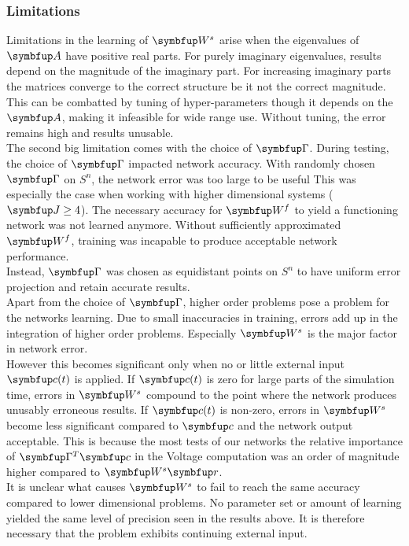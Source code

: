 \subsubsection{Limitations}
Limitations in the learning of $\bmu{W}^s$ arise when the eigenvalues of $\bmu{A}$ have positive real parts. For purely imaginary eigenvalues, results depend on the magnitude of the imaginary part. For increasing imaginary parts the matrices converge to the correct structure be it not the correct magnitude. This can be combatted by tuning of hyper-parameters though it depends on the $\bmu{A}$, making it infeasible for wide range use. Without tuning, the error remains high and results unusable.\\
The second big limitation comes with the choice of $\bmu{\Gamma}$. During testing, the choice of $\bmu{\Gamma}$ impacted network accuracy. With randomly chosen $\bmu{\Gamma}$ on $\mathit{S}^n$, the network error was too large to be useful This was especially the case when working with higher dimensional systems ($\bmu{J}\geq4$). The necessary accuracy for $\bmu{W}^f$ to yield a functioning network was not learned anymore. Without sufficiently approximated $\bmu{W}^f$, training was incapable to produce acceptable network performance.\\
Instead, $\bmu{\Gamma}$ was chosen as equidistant points on $\mathit{S}^n$ to have uniform error projection and retain accurate results.\\
Apart from the choice of $\bmu{\Gamma}$, higher order problems pose a problem for the networks learning. Due to small inaccuracies in training, errors add up in the integration of higher order problems. Especially $\bmu{W}^s$ is the major factor in network error.\\
However this becomes significant only when no or little external input $\bmu{c}(t)$ is applied. If $\bmu{c}(t)$ is zero for large parts of the simulation time, errors in $\bmu{W}^s$ compound to the point where the network produces unusably erroneous results. If $\bmu{c}(t)$ is non-zero, errors in $\bmu{W}^s$ become less significant compared to $\bmu{c}$ and the network output acceptable. This is because the most tests of our networks the relative importance of $\bmu{\Gamma}^T\bmu{c}$ in the Voltage computation was an order of magnitude higher compared to $\bmu{W}^s\bmu{r}$.\\
It is unclear what causes $\bmu{W}^s$ to fail to reach the same accuracy compared to lower dimensional problems. No parameter set or amount of learning yielded the same level of precision seen in the results above. It is therefore necessary that the problem exhibits continuing external input.\\

